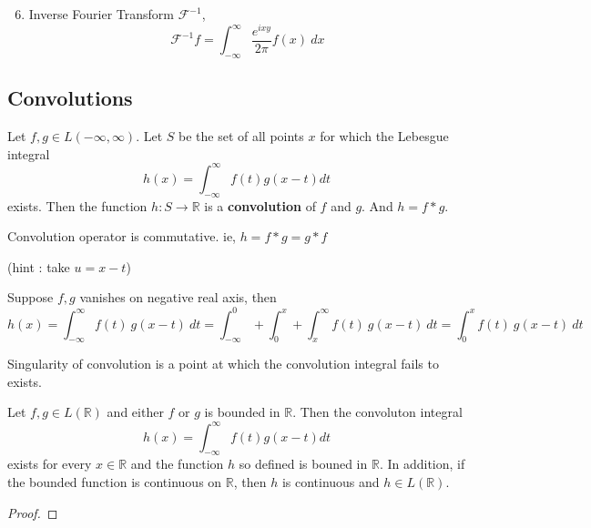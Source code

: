 \begin{enumerate}
	\setcounter{enumi}{5}
	\item Inverse Fourier Transform $\mathscr{F}^{-1}$,
		\[ \mathscr{F}^{-1}f = \int_{-\infty}^\infty \frac{e^{ixy}}{2\pi}f(x)\ dx \]
\end{enumerate}

\subsection{Convolutions}
\begin{definition}
	Let \( f,g \in L(-\infty,\infty) \).
	Let $S$ be the set of all points $x$ for which the Lebesgue integral
	\[ h(x) = \int_{-\infty}^\infty f(t) g(x-t) dt \]
	exists.
	Then the function \( h : S \to \mathbb{R} \) is a \textbf{convolution} of $f$ and $g$.
	And \( h = f \ast g \).
\end{definition}

\begin{remark}
	Convolution operator is commutative.
	ie, \( h = f \ast g = g \ast f \)
	\begin{commentary}
		(hint : take $u = x-t$)
	\end{commentary}
\end{remark}

\begin{remark}
	Suppose $f,g$ vanishes on negative real axis, then
	\[ h(x) = \int_{-\infty}^\infty f(t)\ g(x-t)\ dt = \int_{-\infty}^0 + \int_0^x  + \int_x^\infty f(t)\ g(x-t)\ dt = \int_0^x f(t)\ g(x-t)\ dt \] 
\end{remark}

\begin{remark}
	Singularity of convolution is a point at which the convolution integral fails to exists.
\end{remark}

\begin{theorem}
	Let \( f,g \in L(\mathbb{R}) \) and either $f$ or $g$ is bounded in $\mathbb{R}$.
	Then the convoluton integral
	\[ h(x) = \int_{-\infty}^\infty f(t) g(x-t) dt \]
	exists for every \( x \in \mathbb{R} \) and the function $h$ so defined is bouned in $\mathbb{R}$.
	In addition, if the bounded function is continuous on $\mathbb{R}$, then $h$ is continuous and \( h \in L(\mathbb{R}) \).
\end{theorem}
\begin{synopsis}
\end{synopsis}
\begin{proof}
\end{proof}

